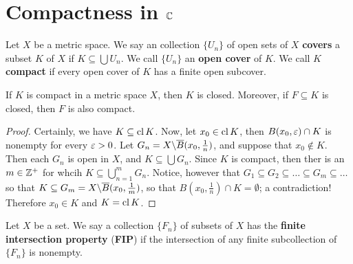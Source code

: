 \section{Compactness in $\mathbb{C}$}

\begin{definition}
    Let $X$ be a metric space. We say an collection  $\{U_n\}$ of open sets of $X$
    \textbf{covers} a subset $K$ of $X$ if  $K \subseteq \bigcup{U_n}$. We call
    $\{U_n\}$ an \textbf{open cover} of $K$. We call  $K$  \textbf{compact} if
    every open cover of $K$ has a finite open subcover.
\end{definition}

\begin{lemma}\label{2.4.1}
    If $K$ is compact in a metric space  $X$, then  $K$ is closed. Moreover, if
     $F \subseteq K$ is closed, then  $F$ is also compact.
\end{lemma}
\begin{proof}
    Certainly, we have $K \subseteq \operatorname{cl}{K}$. Now, let $x_0 \in \operatorname{cl}{K}$, then
    $B(x_0,\varepsilon) \cap K$ is nonempty for every $\varepsilon>0$. Let
    $G_n=X \backslash \overline{B}(x_0, \frac{1}{n})$, and suppose that $x_0 \notin K$.
    Then each $G_n$ is open in  $X$, and  $K \subseteq \bigcup{G_n}$. Since $K$
    is compact, then ther is an  $m \in \mathbb{Z}^+$ for whcih  $K \subseteq
    \bigcup_{n=1}^m{G_n}$. Notice, however that $G_1 \subseteq G_2 \subseteq
    \dots \subseteq G_m \subseteq \dots$ so that $K \subseteq
    G_m=X \backslash \overline{B}(x_0,\frac{1}{m})$, so that $B(x_0, \frac{1}{n}) \cap
    K=\emptyset$; a contradiction! Therefore $x_0 \in K$ and $K=\operatorname{cl}{K}$.
\end{proof}

\begin{definition}
    Let $X$ be a set. We say a collection $\{F_n\}$ of subsets of $X$ has the
     \textbf{finite intersection property} (\textbf{FIP}) if the intersection of
     any finite subcollection of $\{F_n\}$ is nonempty.
\end{definition}

